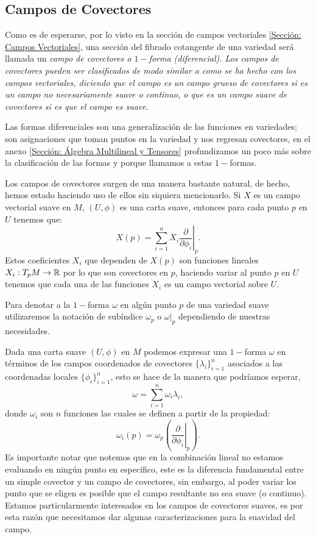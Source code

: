 \subsection{Campos de Covectores}\label{Subsección: Campos de Covectores}
Como es de esperarse, por lo visto en la sección de campos vectoriales \ref{Sección: Campos Vectoriales}, una sección del fibrado cotangente de una variedad será llamada un \it{campo de covectores} o \it{$1-$forma (diferencial)}. Los campos de covectores pueden ser clasificados de modo similar a como se ha hecho con los campos vectoriales, diciendo que el campo es un \it{campo grueso de covectores} si es un campo no necesariamente suave o continuo, o que es un \it{campo suave de covectores} si es que el campo es suave.

Las formas diferenciales son una generalización de las funciones en variedades; son asignaciones que toman puntos en la variedad y nos regresan covectores, en el anexo \ref{Sección: Álgebra Multilineal y Tensores} profundizamos un poco más sobre la clasificación de las formas y porque llamamos a estas $1-$formas.

Los campos de covectores surgen de una manera bastante natural, de hecho, hemos estado haciendo uso de ellos sin siquiera mencionarlo. Si $X$ es un campo vectorial suave en $M$, $(U, \phi)$ es una carta suave, entonces para cada punto $p$ en $U$ tenemos que:
\[
	X(p) = \sum_{i=1}^{n} X_i \left. \frac{\partial}{\partial \phi_i} \right|_{p}.
\]
Estos coeficientes $X_i$ que dependen de $X(p)$ son funciones lineales $X_i: T_{p}M \to \mathbb{R}$ por lo que son covectores en $p$, haciendo variar al punto $p$ en $U$ tenemos que cada una de las funciones $X_i$ es un campo vectorial sobre $U$.

Para denotar a la $1-$forma $\omega$ en algún punto $p$ de una variedad suave utilizaremos la notación de subíndice $\omega_p$ o $\omega|_{p}$ dependiendo de nuestras necesidades.

Dada una carta suave $(U,\phi)$ en $M$ podemos expresar una $1-$forma $\omega$ en términos de los campos coordenados de covectores $\{\lambda_i\}_{i=1}^n$ asociados a las coordenadas locales $\{\phi_i\}_{i=1}^n$, esto se hace de la manera que podríamos esperar,
\[
	\omega = \sum_{i=1}^{n} \omega_i \lambda_i,
\]
donde $\omega_i$ son $n$ funciones las cuales se definen a partir de la propiedad:
\[
	\omega_i(p)
	=
	\omega_p \left(\left.
	\frac{\partial}{\partial \phi_i}
	\right|_{p}\right).
\]
Es importante notar que notemos que en la combinación lineal no estamos evaluando en ningún punto en específico, este es la diferencia fundamental entre un simple covector y un campo de covectores, sin embargo, al poder variar los punto que se eligen es posible que el campo resultante no sea suave (o continuo). Estamos particularmente interesados en los campos de covectores suaves, es por esta razón que necesitamos dar algunas caracterizaciones para la suavidad del campo.

